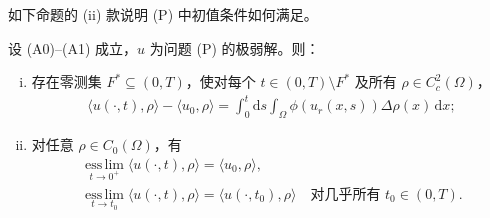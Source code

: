 \documentclass[../../main.tex]{subfiles}%
\begin{document}
如下命题的 (ii) 款说明 (P) 中初值条件如何满足。

\begin{proposition}\label{proposition:ch06-6.1.1}\label{proposition:ch6-1.1}
设 (A0)--(A1) 成立，$u$ 为问题 (P) 的极弱解。则：
\begin{enumerate}[(i)]
\item 存在零测集 $F^*\subseteq(0,T)$，使对每个 $t\in(0,T)\setminus F^*$ 及所有 $\rho\in C^2_c(\Omega)$，
\begin{align}
\langle u(\cdot,t),\rho\rangle-\langle u_0,\rho\rangle
= \int_0^t\mathrm{d}s\int_\Omega\phi(u_r(x,s))\Delta\rho(x)\,\mathrm{d}x; \label{align:ch6-6.4}
\end{align}
\item 对任意 $\rho\in C_0(\Omega)$，有
\begin{align}
\operatorname*{ess\,lim}_{t\to0^+}\langle u(\cdot,t),\rho\rangle=\langle u_0,\rho\rangle, \label{align:ch6-6.5a}\\
\operatorname*{ess\,lim}_{t\to t_0}\langle u(\cdot,t),\rho\rangle=\langle u(\cdot,t_0),\rho\rangle
\quad\text{对几乎所有 }t_0\in(0,T). \label{align:ch6-6.5b}
\end{align}
\end{enumerate}
\end{proposition}
\end{document}
